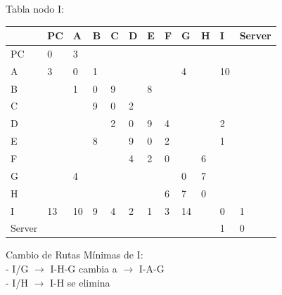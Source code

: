 \documentclass[a4paper]{article}
\begin{document}
\begin{table}[h]
Tabla nodo I:\\
\begin{tabular}{|l|l|l|l|l|l|l|l|l|l|l|l|}
\hline
       & PC & A  & B & C & D & E & F & G  & H & I  & Server \\ \hline
PC     & 0  & 3  &   &   &   &   &   &    &   &    &        \\ \hline
A      & 3  & 0  & 1 &   &   &   &   & 4  &   & 10 &        \\ \hline
B      &    & 1  & 0 & 9 &   & 8 &   &    &   &    &        \\ \hline
C      &    &    & 9 & 0 & 2 &   &   &    &   &    &        \\ \hline
D      &    &    &   & 2 & 0 & 9 & 4 &    &   & 2  &        \\ \hline
E      &    &    & 8 &   & 9 & 0 & 2 &    &   & 1  &        \\ \hline
F      &    &    &   &   & 4 & 2 & 0 &    & 6 &    &        \\ \hline
G      &    & 4  &   &   &   &   &   & 0  & 7 &    &        \\ \hline
H      &    &    &   &   &   &   & 6 & 7  & 0 &    &        \\ \hline
I      & 13 & 10 & 9 & 4 & 2 & 1 & 3 & 14 &   & 0  & 1      \\ \hline
Server &    &    &   &   &   &   &   &    &   & 1  & 0      \\ \hline
\end{tabular}

Cambio de Rutas Mínimas de I:\\
-	I/G  $\rightarrow$  I-H-G  cambia a  $\rightarrow$  I-A-G\\
-	I/H  $\rightarrow$  I-H  se elimina\\

\end{table}

\clearpage
\end{document}
